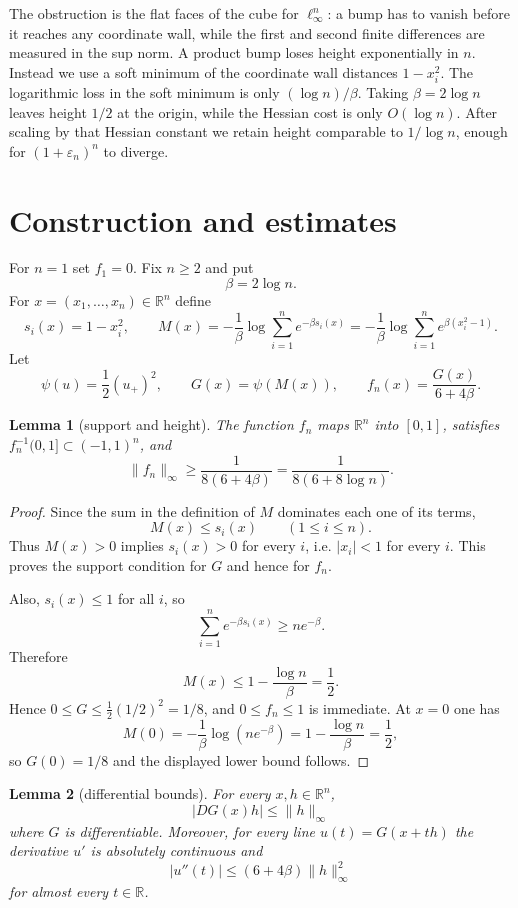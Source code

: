 \documentclass[11pt]{article}
\newtheorem{lemma}{Lemma}
\begin{document}
The obstruction is the flat faces of the cube for $\ell_\infty^n$: a bump has
to vanish before it reaches any coordinate wall, while the first and second
finite differences are measured in the sup norm.  A product bump loses height
exponentially in $n$.  Instead we use a soft minimum of the coordinate wall
distances $1-x_i^2$.  The logarithmic loss in the soft minimum is only
$(\log n)/\beta$.  Taking $\beta=2\log n$ leaves height $1/2$ at the origin,
while the Hessian cost is only $O(\log n)$.  After scaling by that Hessian
constant we retain height comparable to $1/\log n$, enough for
$(1+\varepsilon_n)^n$ to diverge.

\section{Construction and estimates}

For $n=1$ set $f_1=0$.  Fix $n\ge 2$ and put
\[
        \beta=2\log n.
\]
For $x=(x_1,\ldots,x_n)\in\mathbb R^n$ define
\[
        s_i(x)=1-x_i^2,\qquad
        M(x)=-\frac{1}{\beta}\log\sum_{i=1}^n e^{-\beta s_i(x)}
        =-\frac{1}{\beta}\log\sum_{i=1}^n e^{\beta(x_i^2-1)}.
\]
Let
\[
        \psi(u)=\frac{1}{2}(u_+)^2,\qquad
        G(x)=\psi(M(x)),\qquad
        f_n(x)=\frac{G(x)}{6+4\beta}.
\]

\begin{lemma}[support and height]
The function $f_n$ maps $\mathbb R^n$ into $[0,1]$, satisfies
$f_n^{-1}(0,1]\subset(-1,1)^n$, and
\[
        \|f_n\|_\infty\ge \frac{1}{8(6+4\beta)}
        =\frac{1}{8(6+8\log n)}.
\]
\end{lemma}

\begin{proof}
Since the sum in the definition of $M$ dominates each one of its terms,
\[
        M(x)\le s_i(x)\qquad(1\le i\le n).
\]
Thus $M(x)>0$ implies $s_i(x)>0$ for every $i$, i.e. $|x_i|<1$ for every $i$.
This proves the support condition for $G$ and hence for $f_n$.

Also, $s_i(x)\le 1$ for all $i$, so
\[
        \sum_{i=1}^n e^{-\beta s_i(x)}\ge n e^{-\beta}.
\]
Therefore
\[
        M(x)\le 1-\frac{\log n}{\beta}=\frac{1}{2}.
\]
Hence $0\le G\le \frac12(1/2)^2=1/8$, and $0\le f_n\le1$ is immediate.  At
$x=0$ one has
\[
        M(0)=-\frac{1}{\beta}\log(ne^{-\beta})
        =1-\frac{\log n}{\beta}=\frac{1}{2},
\]
so $G(0)=1/8$ and the displayed lower bound follows.
\end{proof}

\begin{lemma}[differential bounds]
For every $x,h\in\mathbb R^n$,
\[
        |DG(x)h|\le \|h\|_\infty
\]
where $G$ is differentiable.  Moreover, for every line
$u(t)=G(x+th)$ the derivative $u'$ is absolutely continuous and
\[
        |u''(t)|\le (6+4\beta)\|h\|_\infty^2
\]
for almost every $t\in\mathbb R$.
\end{lemma}
\end{document}
